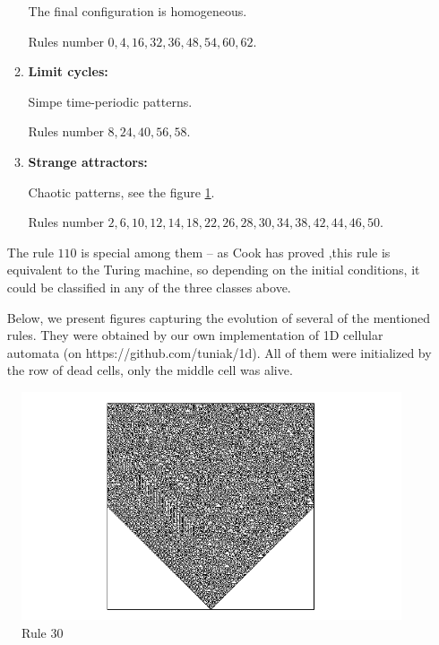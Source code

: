 \begin{enumerate}
\begin{enumerate}
The final configuration is homogeneous. 

Rules number $0,4,16,32,36,48,54,60,62$.

\item \textbf{Limit cycles:}

Simpe time-periodic patterns. 

Rules number $8,24,40,56,58$.

\item \textbf{Strange attractors:}

Chaotic patterns, see the figure \ref{rule30}. 

Rules number $2,6,10,12,14,18,22,26,28,30,34,38,42,44,46,50$.

%
%
%
\end{enumerate}
The rule $110$ is special among them -- as Cook has proved \cite{cook},this rule is equivalent to the Turing machine, so depending on the initial conditions, it could be classified in any of the three classes above.

Below, we present figures capturing the evolution of several of the mentioned rules.
They were obtained by our own implementation of 1D cellular automata (on https://github.com/tuniak/1d).
All of them were initialized by the row of dead cells, only the middle cell was alive.

\end{enumerate}

\begin{figure}[!t]
 \centering
 \includegraphics[trim = 40mm 0mm 0mm 0mm, width=1.7\textwidth]{./img/30_500}
 \caption{Rule 30}
 \label{rule30}
\end{figure}

